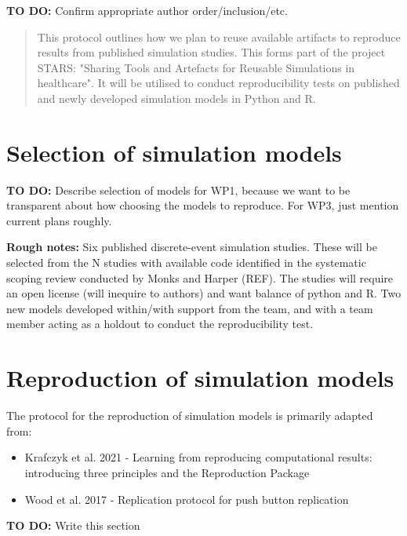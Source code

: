 \textbf{TO DO:} Confirm appropriate author order/inclusion/etc.

\begin{shaded}
    \begin{abstract}
        This protocol outlines how we plan to reuse available artifacts to reproduce results from published simulation studies. This forms part of the project STARS: "Sharing Tools and Artefacts for Reusable Simulations in healthcare". It will be utilised to conduct reproducibility tests on published and newly developed simulation models in Python and R.
    \end{abstract}
\end{shaded}

\section{Selection of simulation models}

\textbf{TO DO:} Describe selection of models for WP1, because we want to be transparent about how choosing the models to reproduce. For WP3, just mention current plans roughly.

\textbf{Rough notes:} Six published discrete-event simulation studies. These will be selected from the N studies with available code identified in the systematic scoping review conducted by Monks and Harper (REF). The studies will require an open license (will inequire to authors) and want balance of python and R. Two new models developed within/with support from the team, and with a team member acting as a holdout to conduct the reproducibility test.

\section{Reproduction of simulation models}

The protocol for the reproduction of simulation models is primarily adapted from:
\begin{itemize}
    \item Krafczyk et al. 2021 - Learning from reproducing computational results: introducing three principles and the Reproduction Package\cite{krafczyk_learning_2021}
    \item Wood et al. 2017 - Replication protocol for push button replication\cite{wood_replication_2018}
\end{itemize}

\textbf{TO DO:} Write this section